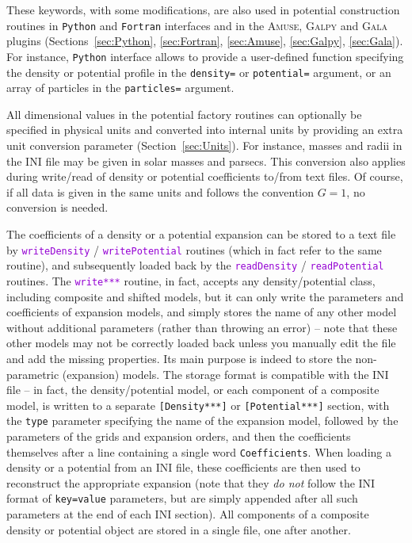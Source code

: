 \documentclass[12pt]{article}
\newcommand{\Amuse}{\textsc{Amuse}\xspace}
\newcommand{\Galpy}{\textsc{Galpy}\xspace}
\newcommand{\Gala} {\textsc{Gala}\xspace}
\newcommand{\Python}{\texttt{Python}\xspace}
\newcommand{\Fortran}{\texttt{Fortran}\xspace}
\newcommand{\ttt}[1]{\textcolor{darkviolet}{\texttt{#1}}}
\newcommand{\ppp}[1]{\textcolor{darkolive} {\texttt{#1}}}
\begin{document}
These keywords, with some modifications, are also used in potential construction routines in \Python and \Fortran interfaces and in the \Amuse, \Galpy and \Gala plugins (Sections~\ref{sec:Python}, \ref{sec:Fortran}, \ref{sec:Amuse}, \ref{sec:Galpy}, \ref{sec:Gala}). For instance, \Python interface allows to provide a user-defined function specifying the density or potential profile in the \ppp{density=} or \ppp{potential=} argument, or an array of particles in the \ppp{particles=} argument.

All dimensional values in the potential factory routines can optionally be specified in physical units and converted into internal units by providing an extra unit conversion parameter (Section~\ref{sec:Units}). For instance, masses and radii in the INI file may be given in solar masses and parsecs. This conversion also applies during write/read of density or potential coefficients to/from text files. Of course, if all data is given in the same units and follows the convention $G=1$, no conversion is needed.

The coefficients of a density or a potential expansion can be stored to a text file by \ttt{writeDensity} / \ttt{writePotential} routines (which in fact refer to the same routine), and subsequently loaded back by the \ttt{readDensity} / \ttt{readPotential} routines. 
The \ttt{write***} routine, in fact, accepts any density/potential class, including composite and shifted models, but it can only write the parameters and coefficients of expansion models, and simply stores the name of any other model without additional parameters (rather than throwing an error) -- note that these other models may not be correctly loaded back unless you manually edit the file and add the missing properties. Its main purpose is indeed to store the non-parametric (expansion) models. The storage format is compatible with the INI file -- in fact, the density/potential model, or each component of a composite model, is written to a separate \ppp{[Density***]} or \ppp{[Potential***]} section, with the \ppp{type} parameter specifying the name of the expansion model, followed by the parameters of the grids and expansion orders, and then the coefficients themselves after a line containing a single word \texttt{Coefficients}. When loading a density or a potential from an INI file, these coefficients are then used to reconstruct the appropriate expansion (note that they \emph{do not} follow the INI format of \texttt{key=value} parameters, but are simply appended after all such parameters at the end of each INI section). All components of a composite density or potential object are stored in a single file, one after another.
\end{document}
